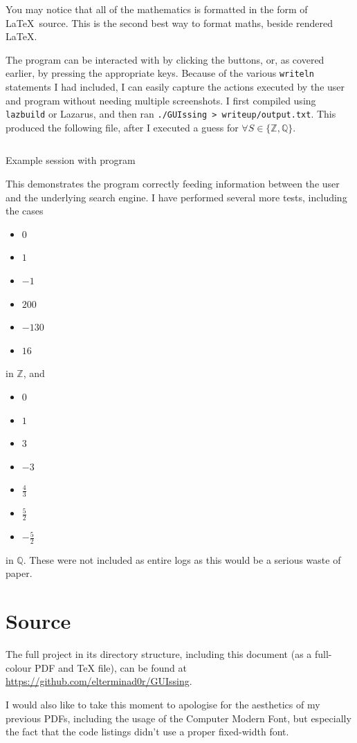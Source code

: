 \documentclass[a4paper,11pt]{article}
\newenvironment{longlisting}
{\addvspace{\baselineskip}\captionsetup{type=listing}}
{\addvspace{\baselineskip}}
\begin{document}
    You may notice that all of the mathematics is formatted in the form of
    \LaTeX\ source. This is the second best way to format maths, beside rendered
    \LaTeX.

    The program can be interacted with by clicking the buttons, or, as covered
    earlier, by pressing the appropriate keys. Because of the various
    \texttt{writeln} statements I had included, I can easily capture
    the actions executed by the user and program without needing multiple
    screenshots. I first compiled using \texttt{lazbuild} or Lazarus, and then
    ran \texttt{./GUIssing > writeup/output.txt}. This produced the
    following file, after I executed a guess for
    $\forall S \in \{\mathbb{Z}, \mathbb{Q}\}$.

\begin{longlisting}
\inputminted{text}{output.txt}
\caption{Example session with program}
\end{longlisting}

    This demonstrates the program correctly feeding information between the user
    and the underlying search engine. I have performed several more tests,
    including the cases

    \begin{itemize}
    \item $0$
    \item $1$
    \item $-1$
    \item $200$
    \item $-130$
    \item $16$
    \end{itemize}
    in $\mathbb{Z}$, and
    \begin{itemize}
    \item $0$
    \item $1$
    \item $3$
    \item $-3$
    \item $\frac{4}{3}$
    \item $\frac{5}{2}$
    \item $-\frac{5}{2}$
    \end{itemize}
    in $\mathbb{Q}$. These were not included as entire logs as this would be a
    serious waste of paper.

    \section{Source}

    The full project in its directory structure, including this document (as a
    full-colour PDF and \TeX{} file), can be found at
    \url{https://github.com/elterminad0r/GUIssing}.

    I would also like to take this moment to apologise for the aesthetics of my
    previous PDFs, including the usage of the Computer Modern Font, but
    especially the fact that the code listings didn't use a proper fixed-width
    font.
\end{document}

